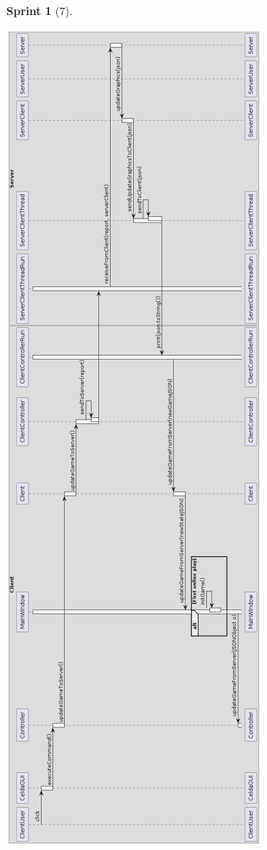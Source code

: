 \documentclass{article}
\theoremstyle{break}
\newtheorem*{sprint}{Sprint}
\begin{document}
\begin{sprint}[7]
\begin{center}
\includegraphics[scale=0.4]{juegoTipicoUmlSprint7.png}
\end{center}

\end{sprint}
\end{document}
